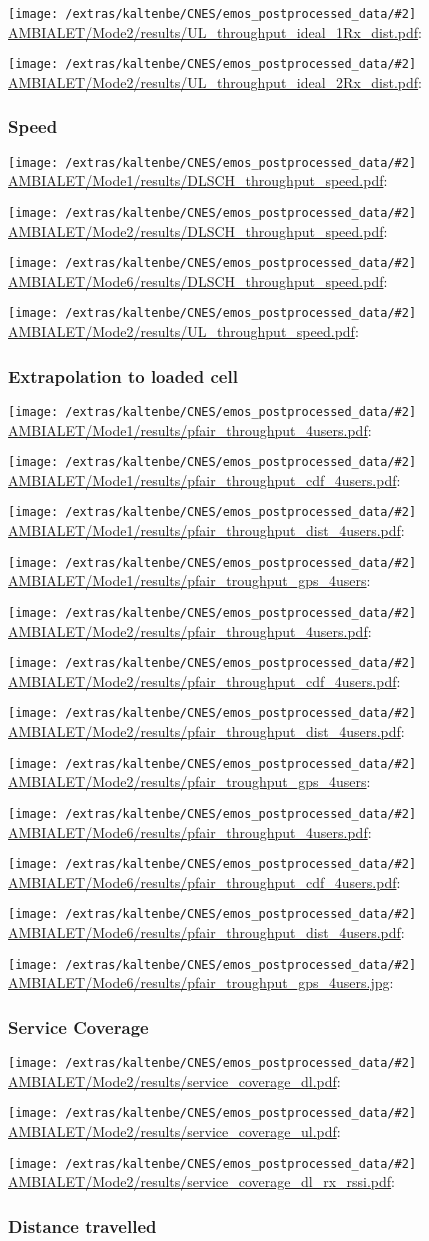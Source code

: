 \documentclass[a4paper,10pt]{article}
\newcommand{\printfile}[2][]{
 \begin{minipage}{8cm}
  \centering
  \texttt{[image: /extras/kaltenbe/CNES/emos\_postprocessed\_data/\#2]}
  \url{#2}: #1

 \end{minipage}
}
\begin{document}
\printfile{AMBIALET/Mode2/results/UL_throughput_ideal_1Rx_dist.pdf}
\printfile{AMBIALET/Mode2/results/UL_throughput_ideal_2Rx_dist.pdf}

\subsubsection{Speed}

\printfile{AMBIALET/Mode1/results/DLSCH_throughput_speed.pdf}
\printfile{AMBIALET/Mode2/results/DLSCH_throughput_speed.pdf}

\printfile{AMBIALET/Mode6/results/DLSCH_throughput_speed.pdf}
\printfile{AMBIALET/Mode2/results/UL_throughput_speed.pdf}

\subsubsection{Extrapolation to loaded cell}

\printfile{AMBIALET/Mode1/results/pfair_throughput_4users.pdf}
\printfile{AMBIALET/Mode1/results/pfair_throughput_cdf_4users.pdf}

\printfile{AMBIALET/Mode1/results/pfair_throughput_dist_4users.pdf}
\printfile{AMBIALET/Mode1/results/pfair_troughput_gps_4users}

\printfile{AMBIALET/Mode2/results/pfair_throughput_4users.pdf}
\printfile{AMBIALET/Mode2/results/pfair_throughput_cdf_4users.pdf}

\printfile{AMBIALET/Mode2/results/pfair_throughput_dist_4users.pdf}
\printfile{AMBIALET/Mode2/results/pfair_troughput_gps_4users}

\printfile{AMBIALET/Mode6/results/pfair_throughput_4users.pdf}
\printfile{AMBIALET/Mode6/results/pfair_throughput_cdf_4users.pdf}

\printfile{AMBIALET/Mode6/results/pfair_throughput_dist_4users.pdf}
\printfile{AMBIALET/Mode6/results/pfair_troughput_gps_4users.jpg}

\subsubsection{Service Coverage}

\printfile{AMBIALET/Mode2/results/service_coverage_dl.pdf}
\printfile{AMBIALET/Mode2/results/service_coverage_ul.pdf}

\printfile{AMBIALET/Mode2/results/service_coverage_dl_rx_rssi.pdf}

\subsubsection{Distance travelled}
\label{sec:dist_travelled_ambialet}
\end{document}
